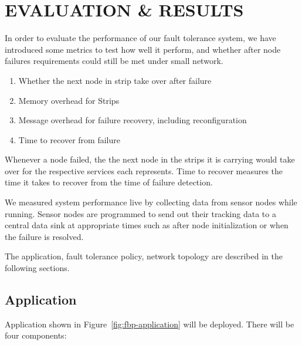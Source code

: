 \cleardoublepage
\singlespacing
\chapter{EVALUATION \& RESULTS}
\label{c:evaluation}
\doublespacing\nointerlineskip


In order to evaluate the performance of our fault tolerance system, we have
introduced some metrics to test how well it perform, and whether after node
failures requirements could still be met under small network.

\begin{enumerate}
\item Whether the next node in strip take over after failure
\item Memory overhead for Strips
\item Message overhead for failure recovery, including reconfiguration
\item Time to recover from failure
\end{enumerate}

Whenever a node failed, the the next node in the strips it is carrying would
take over for the respective services each represents.
Time to recover measures the time it takes to recover from the time of failure
detection.

We measured system performance live by collecting data from sensor nodes while
running. Sensor nodes are programmed to send out their tracking data to
a central data sink at appropriate times such as after node initialization or
when the failure is resolved.

The application, fault tolerance policy, network topology are described in the
following sections.


\section{Application}

Application shown in Figure~\ref{fig:fbp-application} will be deployed.  There
will be four components: 

